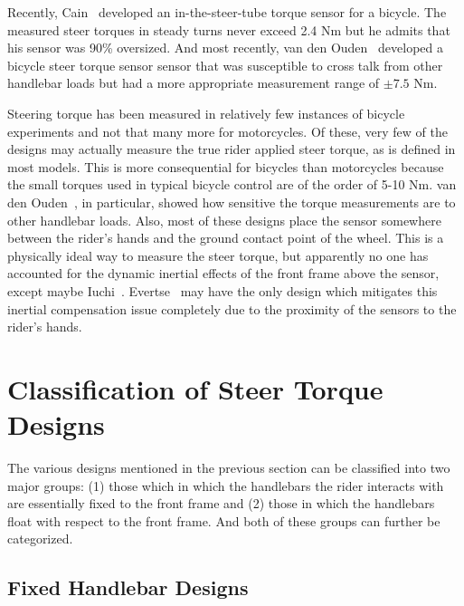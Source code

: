 \documentclass[10pt]{article}
\begin{document}
Recently, Cain~\cite{Cain2012} developed an in-the-steer-tube torque sensor for
a bicycle. The measured steer torques in steady turns never exceed 2.4 Nm but
he admits that his sensor was 90\% oversized. And most recently, van den
Ouden~\cite{Ouden2011} developed a bicycle steer torque sensor sensor that was
susceptible to cross talk from other handlebar loads but had a more appropriate
measurement range of $\pm7.5$ Nm.



Steering torque has been measured in relatively few instances of bicycle
experiments and not that many more for motorcycles. Of these, very few of the
designs may actually measure the true rider applied steer torque, as is defined
in most models. This is more consequential for bicycles than motorcycles
because the small torques used in typical bicycle control are of the order of
5-10 Nm. van den Ouden~\cite{Ouden2011}, in particular, showed how sensitive
the torque measurements are to other handlebar loads. Also, most of these
designs place the sensor somewhere between the rider's hands and the ground
contact point of the wheel. This is a physically ideal way to measure the steer
torque, but apparently no one has accounted for the dynamic inertial effects of
the front frame above the sensor, except maybe Iuchi~\cite{Iuchi2006}.
Evertse~\cite{Evertse2010} may have the only design which mitigates this
inertial compensation issue completely due to the proximity of the sensors to
the rider's hands.

\section*{Classification of Steer Torque Designs}

The various designs mentioned in the previous section can be classified into
two major groups: (1) those which in which the handlebars the rider interacts
with are essentially fixed to the front frame and (2) those in which the
handlebars float with respect to the front frame. And both of these groups can
further be categorized.

\subsection*{Fixed Handlebar Designs}
\end{document}

